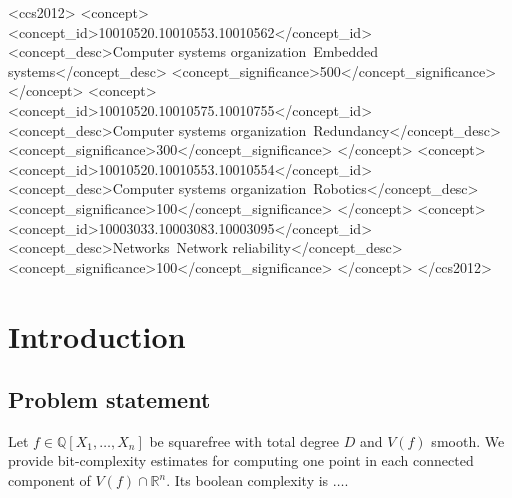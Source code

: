 \documentclass[sigconf]{acmart}
\def\R{\mathbb{R}}
\begin{document}
\begin{CCSXML}
<ccs2012>
 <concept>
  <concept_id>10010520.10010553.10010562</concept_id>
  <concept_desc>Computer systems organization~Embedded systems</concept_desc>
  <concept_significance>500</concept_significance>
 </concept>
 <concept>
  <concept_id>10010520.10010575.10010755</concept_id>
  <concept_desc>Computer systems organization~Redundancy</concept_desc>
  <concept_significance>300</concept_significance>
 </concept>
 <concept>
  <concept_id>10010520.10010553.10010554</concept_id>
  <concept_desc>Computer systems organization~Robotics</concept_desc>
  <concept_significance>100</concept_significance>
 </concept>
 <concept>
  <concept_id>10003033.10003083.10003095</concept_id>
  <concept_desc>Networks~Network reliability</concept_desc>
  <concept_significance>100</concept_significance>
 </concept>
</ccs2012>
\end{CCSXML}




\maketitle
%
%
%
%
\section{Introduction}
%
\subsection{Problem statement}
%
Let $f \in \mathbb{Q}[X_1,\hdots,X_n]$ be squarefree with total degree $D$ and $V(f)$ smooth. We provide bit-complexity estimates for computing one point in each connected component of $V(f)\cap \R^n.$ Its boolean complexity is $\hdots$.
%
\end{document}
